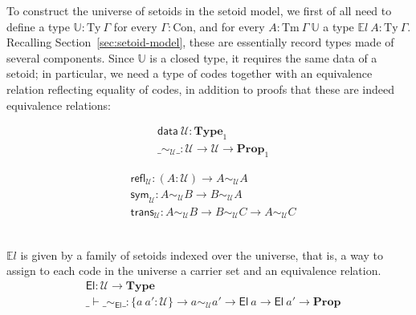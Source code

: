 \documentclass[autoref]{llncs}
\newcommand{\GG}{\Gamma}
\newcommand{\setoidU}{\mathcal{U}}
\newcommand{\mType}{\mathbf{Type}}
\newcommand{\mProp}{\mathbf{Prop}}
\newcommand{\Con}{\mathrm{Con}}
\newcommand{\Ty}{\mathrm{Ty}}
\newcommand{\Tm}{\mathrm{Tm}}
\newcommand{\El}{\textsf{El}}
\newcommand{\Uty}{\mathds{U}}
\newcommand{\EL}{\mathds{E}l}
\newcommand{\equ}[2]{#1 \sim_\setoidU #2}
\begin{document}
To construct the universe of setoids in the setoid model, we first of all need
to define a type $\Uty : \Ty\ \GG$ for every $\GG : \Con$, and for every $A :
\Tm\ \GG\ \Uty$ a type $\mathds{E}l\ A : \Ty\ \GG$. Recalling
Section~\ref{sec:setoid-model}, these are essentially record types made of several
components. Since $\Uty$ is a closed type, it requires the same data of a
setoid; in particular, we need a type of codes together with an equivalence
relation reflecting equality of codes, in addition to proofs that these are
indeed equivalence relations: \\
\begin{minipage}{0.5\textwidth}
\vspace{-0.2em}
\begin{align*}
  & \textsf{data} \ \setoidU : \mType_1 \\
  & \_\sim_\setoidU\_ : \setoidU \to \setoidU \to \mProp_1
\end{align*}
\end{minipage}
\begin{minipage}{0.5\textwidth}
\vspace{-0.2em}
\begin{align*}
  & \textsf{refl}_\setoidU : (A : \setoidU) \to \equ{A}{A} \\
  & \textsf{sym}_\setoidU : \equ{A}{B} \to \equ{B}{A} \\
  & \textsf{trans}_\setoidU : \equ{A}{B} \to \equ{B}{C} \to \equ{A}{C}
\end{align*}
\end{minipage}
\\

$\EL$ is given by a family of setoids indexed over the universe, that is, a way
to assign to each code in the universe a carrier set and an equivalence
relation.
\vspace{-0.2em}
\begin{align*}
  & \El : \setoidU \to \mType \\
  & \_\vdash\_\sim_\El\_ : \{a\ a' : \setoidU\} \to a \sim_\setoidU a' \to \El\ a \to \El\ a' \to \mProp
\end{align*}
\end{document}
